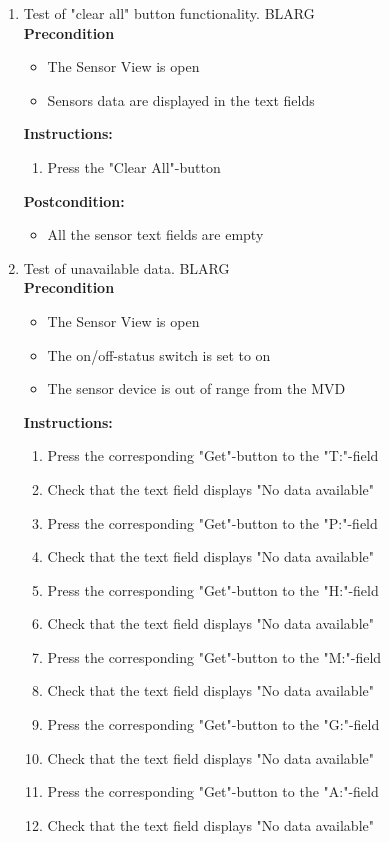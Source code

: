 \documentclass[a4paper]{article}
\newlength{\testlabellength}
\newenvironment{testlist}{\begin{enumerate}[label=\bfseries Instruction \thesubsection.\arabic* , labelindent=0pt, labelwidth=\testlabellength , leftmargin=2cm]}{\end{enumerate}}
\newenvironment{precondition}{
{\color{white}BLARG}\\ 
\textbf{Precondition}
\begin{itemize}[labelindent=0cm, labelwidth=2cm , leftmargin=1cm]
}
{\end{itemize}}
\newenvironment{instruction}{
\textbf{Instructions:}
\begin{enumerate}[label=\bfseries  \arabic*., labelindent=0cm, labelwidth=2cm , leftmargin=1cm]
}
{\end{enumerate}}
\newenvironment{postcondition}{
\textbf{Postcondition:}
\begin{itemize}[labelindent=0cm, labelwidth=2cm , leftmargin=1cm]
}
{\end{itemize}}
\begin{document}
\begin{appendices}
\begin{testlist}
	\item Test of "clear all" button functionality.
		\begin{precondition}
			\item The Sensor View is open
			\item Sensors data are displayed in the text fields
		\end{precondition}
		\begin{instruction}
			\item Press the "Clear All"-button
		\end{instruction}
		\begin{postcondition}
			\item All the sensor text fields are empty
		\end{postcondition}
\newpage
	\item Test of unavailable data.
		\begin{precondition}
			\item The Sensor View is open
			\item The on/off-status switch is set to on
			\item The sensor device is out of range from the MVD
		\end{precondition}
		\begin{instruction}
			\item Press the corresponding "Get"-button to the "T:"-field
		    \item Check that the text field displays "No data available"
			\item Press the corresponding "Get"-button to the "P:"-field
			\item Check that the text field displays "No data available"
			\item Press the corresponding "Get"-button to the "H:"-field
			\item Check that the text field displays "No data available"
			\item Press the corresponding "Get"-button to the "M:"-field
			\item Check that the text field displays "No data available"
			\item Press the corresponding "Get"-button to the "G:"-field
			\item Check that the text field displays "No data available"
			\item Press the corresponding "Get"-button to the "A:"-field
			\item Check that the text field displays "No data available"
    	\end{instruction}



\end{testlist}
\end{appendices}
\end{document}
